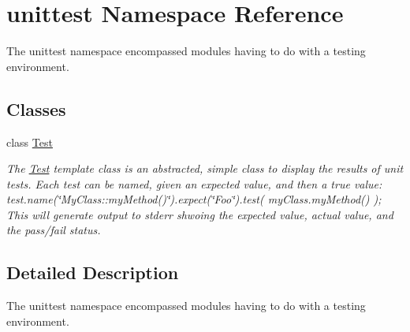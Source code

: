 \hypertarget{namespaceunittest}{
\section{unittest Namespace Reference}
\label{namespaceunittest}
}


The unittest namespace encompassed modules having to do with a testing environment.  


\subsection*{Classes}
\begin{DoxyCompactItemize}
\item 
class \hyperlink{classunittest_1_1Test}{Test}
\begin{DoxyCompactList}\small\item\em The \hyperlink{classunittest_1_1Test}{Test} template class is an abstracted, simple class to display the results of unit tests. Each test can be named, given an expected value, and then a true value: test.name(\char`\"{}MyClass::myMethod()\char`\"{}).expect(\char`\"{}Foo\char`\"{}).test( myClass.myMethod() ); This will generate output to stderr shwoing the expected value, actual value, and the pass/fail status. \item\end{DoxyCompactList}\end{DoxyCompactItemize}


\subsection{Detailed Description}
The unittest namespace encompassed modules having to do with a testing environment. 